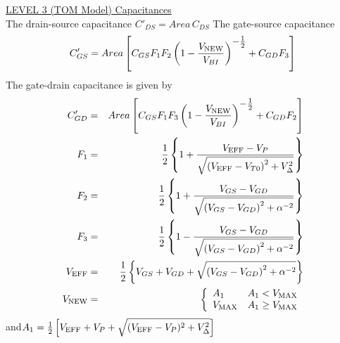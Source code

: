 \noindent\underline{\sc LEVEL 3 (TOM Model) Capacitances
 \label{blevel3cap.txt}}\\[0.1in]
The drain-source capacitance
$C'_{DS} = Area\,C_{DS}$\inlineeq
The gate-source capacitance
\begin{equation}
C'_{GS} = Area\left[C_{GS}F_1F_2\left(1 - {{\textstyle V_{\mbox{\scriptsize NEW}}}
   \over{\textstyle V_{BI}}}\right)^{\textstyle - \frac{1}{2}}
   + C_{GD}F_3\right]
\end{equation}
The gate-drain capacitance is given by
\begin{eqnarray}
C'_{GD} &=& Area\left[C_{GS}F_1F_3\left(1 - {{\textstyle V_{\ms{NEW}}}
   \over{\textstyle V_{BI}}}\right)^{\textstyle - \frac{1}{2}}
   + C_{GD}F_2\right]\\
F_1 & = & {{\textstyle 1}\over{\textstyle 2}} \left\{ 1 +
    {{\textstyle V_{\ms{EFF}}-V_P}
    \over{\textstyle\sqrt{\left( V_{\ms{EFF}}-V_{T0}\right)^2+V_{\Delta}^2}}}\right\}\\
F_2 & = & {{\textstyle 1}\over{\textstyle 2}} \left\{ 1 +
    {{\textstyle V_{GS}-V_{GD}}
    \over{\textstyle\sqrt{\left( V_{GS}-V_{GD}\right)^2+\alpha^{-2}}}}\right\}\\
F_3 & = & {{\textstyle 1}\over{\textstyle 2}} \left\{ 1 -
    {{\textstyle V_{GS}-V_{GD}}
    \over{\textstyle\sqrt{\left( V_{GS}-V_{GD}\right)^2+\alpha^{-2}}}}\right\}\\
V_{\ms{EFF}} & = & {{\textstyle 1}\over{\textstyle 2}} \left\{V_{GS}+V_{GD}+
    \sqrt{\left( V_{GS}-V_{GD}\right)^2+\alpha^{-2}}\right\}\\
V_{\ms{NEW}}&=&\left\{ \begin{array}{ll}
    A_1 & A_1 < V_{\ms{MAX}} \\
    V_{\ms{MAX}} & A_1 \ge V_{\ms{MAX}} \\
      \end{array} \right. %
\end{eqnarray}
and\hfill$A_1 = \frac{1}{2}\left[V_{\mbox{\scriptsize EFF}} + V_P + \sqrt{(V_{\mbox{\scriptsize EFF}}-V_P)^2+V_{\Delta}^2}\right]$
\inlineeq

